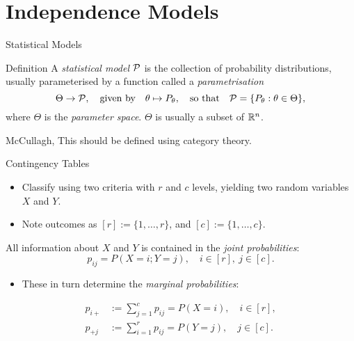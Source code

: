 \section{Independence Models}

\begin{frame}{Statistical Models}
    \begin{block}{Definition}
    A \emph{statistical model} $\mathcal{P}$ is the collection of probability distributions, usually parameterised by a function  called a \emph{parametrisation}
    $$ \Theta \rightarrow \mathcal{P}, \quad \text{given by} \quad \theta \mapsto P_{\theta},\quad \text{so that}\quad \mathcal{P} = \{ P_{\theta} : \theta \in \Theta \}, $$
    where $\Theta$ is the \emph{parameter space}. $\Theta$ is usually a subset of $\mathbb{R}^{n}$.
    \end{block}

    \begin{block}{McCullagh, \cite{PM2002}}
    This should be defined using category theory.
    \end{block}

\end{frame}

\begin{frame}{Contingency Tables}
    
    \begin{itemize}
        \item Classify using two criteria with $r$ and $c$ levels, yielding two random variables $X$ and $Y$. 
        \item Note outcomes as $[r] := \{1,\ldots, r\}$, and $[c] := \{ 1, \ldots, c \}$.
    \end{itemize}
    
    All information about $X$ and $Y$ is contained in the \emph{joint probabilities}:
    $$ p_{ij} = P(X = i; Y = j), \quad i \in [r],\ j \in [c]. $$

    \begin{itemize}
        \item These in turn determine the \emph{marginal probabilities}:
    \end{itemize}
    \vspace*{-1pt}
    \begin{equation*}
        \begin{split}
            p_{i+} &:= \sum_{j = 1}^{c} p_{ij} = P(X = i), \quad i \in [r], \\
            p_{+j} &:= \sum_{i = 1}^{r} p_{ij} = P(Y = j), \quad j \in [c].
        \end{split}
    \end{equation*}

\end{frame}

